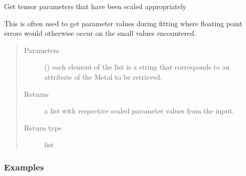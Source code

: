 \documentclass[a4paper,10pt,english,openany,oneside]{sphinxmanual}
\begin{document}
\begin{fulllineitems}
\begin{fulllineitems}
\begin{fulllineitems}
\label{\detokenize{reference/generated/paramagpy.metal.Metal.get_params:paramagpy.metal.Metal.get_params}}
\sphinxAtStartPar
Get tensor parameters that have been scaled appropriately

\sphinxAtStartPar
This is often used to get parameter values during fitting where
floating point errors would otherwise occur on the small values
encountered.
\begin{quote}\begin{description}
\item[{Parameters}] \leavevmode
\sphinxAtStartPar
{} () \textendash{} each element of the list is a string that corresponds to
an attribute of the Metal to be retrieved.

\item[{Returns}] \leavevmode
\sphinxAtStartPar
{} \textendash{} a list with respective scaled parameter values from the input.

\item[{Return type}] \leavevmode
\sphinxAtStartPar
list

\end{description}\end{quote}
\subsubsection*{Examples}

\begin{sphinxVerbatim}[commandchars=\\\{\}]
  \PYG{p}{[} \PYG{p}{]}\PYG{p}{[}\PYG{p}{]}
\PYG{p}{[}\PYG{p}{]}
\end{sphinxVerbatim}


\end{fulllineitems}
\end{fulllineitems}
\end{fulllineitems}
\end{document}
